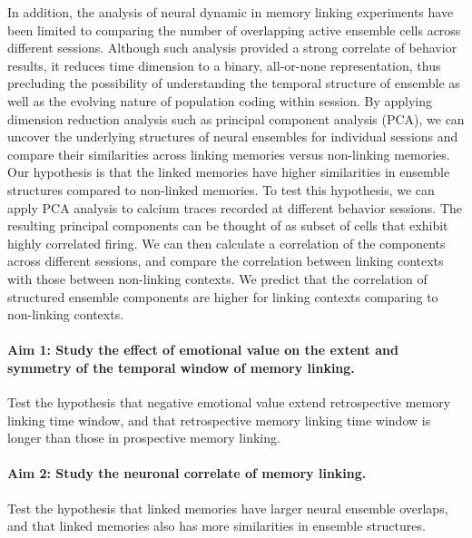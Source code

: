 \documentclass[master.tex]{subfiles}
\begin{document}
In addition, the analysis of neural dynamic in memory linking experiments have
been limited to comparing the number of overlapping active ensemble cells across
different sessions. Although such analysis provided a strong correlate of
behavior results, it reduces time dimension to a binary, all-or-none
representation, thus precluding the possibility of understanding the temporal
structure of ensemble as well as the evolving nature of population coding within
session. By applying dimension reduction analysis such as principal component
analysis (PCA), we can uncover the underlying structures of neural ensembles for
individual sessions and compare their similarities across linking memories
versus non-linking memories. Our hypothesis is that the linked memories have
higher similarities in ensemble structures compared to non-linked memories. To
test this hypothesis, we can apply PCA analysis to calcium traces recorded at
different behavior sessions. The resulting principal components can be thought
of as subset of cells that exhibit highly correlated firing. We can then
calculate a correlation of the components across different sessions, and compare
the correlation between linking contexts with those between non-linking
contexts. We predict that the correlation of structured ensemble components are
higher for linking contexts comparing to non-linking contexts.

\paragraph{Aim 1: Study the effect of emotional value on the extent and symmetry
  of the temporal window of memory linking.} Test the hypothesis that negative
emotional value extend retrospective memory linking time window, and that
retrospective memory linking time window is longer than those in prospective
memory linking.

\paragraph{Aim 2: Study the neuronal correlate of memory linking.} Test the
hypothesis that linked memories have larger neural ensemble overlaps, and that
linked memories also has more similarities in ensemble structures.

\newpage
\end{document}
